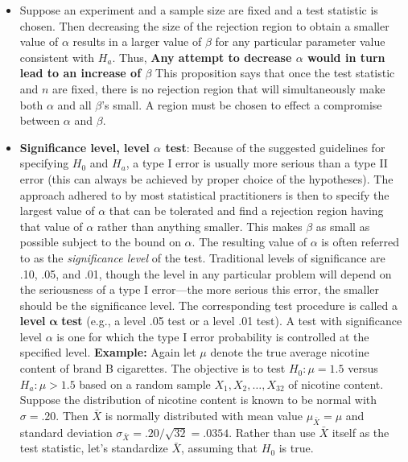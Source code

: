 \documentclass{report}
\begin{document}
\begin{itemize}
\begin{enumerate}
    \end{enumerate}
\item Suppose an experiment and a sample size are fixed and a test statistic is chosen. Then decreasing the size of the rejection region to obtain a smaller value of \( \alpha \) results in a larger value of \( \beta \) for any particular parameter value consistent with \( H_a \).
    \bigbreak \noindent 
    Thus, \textbf{Any attempt to decrease $\alpha$ would in turn lead to an increase of $\beta$}
    \bigbreak \noindent 
    This proposition says that once the test statistic and $n$ are fixed, there is no rejection  region that will simultaneously make both $\alpha$ and all $\beta$’s small. A region must be chosen to effect a compromise between $\alpha $ and $\beta$.
\item \textbf{Significance level, level $\alpha$ test}:
    Because of the suggested guidelines for specifying \( H_0 \) and \( H_a \), a type I error is usually more serious than a type II error (this can always be achieved by proper choice of the hypotheses). The approach adhered to by most statistical practitioners is then to specify the largest value of \( \alpha \) that can be tolerated and find a rejection region having that value of \( \alpha \) rather than anything smaller. This makes \( \beta \) as small as possible subject to the bound on \( \alpha \). The resulting value of \( \alpha \) is often referred to as the \textit{significance level} of the test. Traditional levels of significance are .10, .05, and .01, though the level in any particular problem will depend on the seriousness of a type I error---the more serious this error, the smaller should be the significance level. The corresponding test procedure is called a \textbf{level} \( \mathbf{\alpha} \) \textbf{test} (e.g., a level .05 test or a level .01 test). A test with significance level \( \alpha \) is one for which the type I error probability is controlled at the specified level.
    \bigbreak \noindent 
    \textbf{Example:} 
    Again let \( \mu \) denote the true average nicotine content of brand B cigarettes. The objective is to test \( H_0: \mu = 1.5 \) versus \( H_a: \mu > 1.5 \) based on a random sample \( X_1, X_2, \ldots, X_{32} \) of nicotine content. Suppose the distribution of nicotine content is known to be normal with \( \sigma = .20 \). Then \( \bar{X} \) is normally distributed with mean value \( \mu_{\bar{X}} = \mu \) and standard deviation \( \sigma_{\bar{X}} = .20/\sqrt{32} = .0354 \).
    \bigbreak \noindent 
    Rather than use \( \bar{X} \) itself as the test statistic, let's standardize \( \bar{X} \), assuming that \( H_0 \) is true.

\end{itemize}
\end{document}
